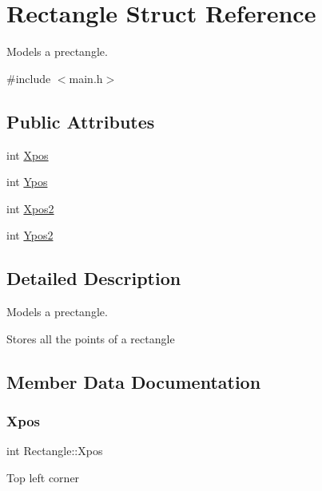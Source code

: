 \hypertarget{struct_rectangle}{}\section{Rectangle Struct Reference}
\label{struct_rectangle}


Models a prectangle.  




{\ttfamily \#include $<$main.\+h$>$}

\subsection*{Public Attributes}
\begin{DoxyCompactItemize}
\item 
int \hyperlink{struct_rectangle_afec44d723041ed9aafdd6ca2052816d6}{Xpos}
\item 
int \hyperlink{struct_rectangle_a4ae94fb818ea9b5b459a9ee3e058bc29}{Ypos}
\item 
int \hyperlink{struct_rectangle_a77f791adbe5bfda2a05b6f61851e073d}{Xpos2}
\item 
int \hyperlink{struct_rectangle_a27c67ab1ffe0dbb8256a649fecb759eb}{Ypos2}
\end{DoxyCompactItemize}


\subsection{Detailed Description}
Models a prectangle. 

Stores all the points of a rectangle 

\subsection{Member Data Documentation}
\mbox{\label{struct_rectangle_afec44d723041ed9aafdd6ca2052816d6}} 
\subsubsection{\texorpdfstring{Xpos}{Xpos}}
{\footnotesize\ttfamily int Rectangle\+::\+Xpos}

Top left corner \mbox{\label{struct_rectangle_a77f791adbe5bfda2a05b6f61851e073d}} 
